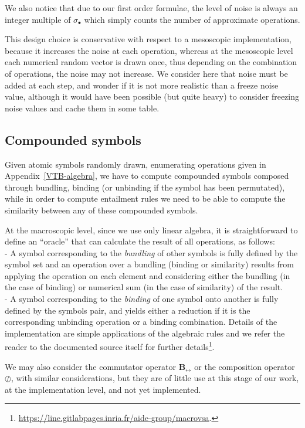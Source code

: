 \documentclass[sn-mathphys]{sn-jnl}
\newcommand{\hhref}[1]{\href{#1}{#1}}
\begin{document}
\begin{appendices}
We also notice that due to our first order formulae, the level of noise is always an integer multiple of $\sigma_\bullet$ which simply counts the number of approximate operations.

This design choice is conservative with respect to a mesoscopic implementation, because it increases the noise at each operation, whereas at the mesoscopic level each numerical random vector is drawn once, thus depending on the combination of operations, the noise may not increase. We consider here that noise must be added at each step, and wonder if it is not more realistic than a freeze noise value, although it would have been possible (but quite heavy) to consider freezing noise values and cache them in some table.

\subsection*{Compounded symbols}

Given atomic symbols randomly drawn, enumerating operations given in Appendix~\ref{VTB-algebra}, we have to compute compounded symbols composed through bundling, binding (or unbinding if the symbol has been permutated), while in order to compute entailment rules we need to be able to compute the similarity between any of these compounded symbols. 

At the macroscopic level, since we use only linear algebra, it is straightforward to define an ``oracle'' that can calculate the result of all operations, as follows:
\\- A symbol corresponding to the {\em bundling} of other symbols is fully defined by the symbol set and an operation over a bundling (binding or similarity) results from applying the operation on each element and considering either the bundling (in the case of binding) or numerical sum (in the case of similarity) of the result.
\\- A symbol corresponding to the {\em binding} of one symbol onto another is fully defined by the symbols pair, and yields either a reduction if it is the corresponding unbinding operation or a binding combination.
Details of the implementation are simple applications of the algebraic rules and we refer the reader to the documented source itself for further details\footnote{\hhref{https://line.gitlabpages.inria.fr/aide-group/macrovsa}.}.

We may also consider the commutator operator $\mathbf{B_{\leftrightarrow}}$ or the composition operator $\oslash$, with similar considerations, but they are of little use at this stage of our work, at the implementation level, and not yet implemented.

\end{appendices}

%

\end{document}
